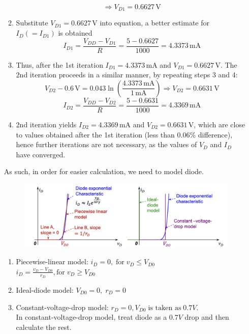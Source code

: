 \begin{enumerate}
\begin{enumerate}
        \[ \Rightarrow V_{D1} = 0.6627 \, \text{V} \]
        \item Substitute \( V_{D1} = 0.6627 \, \text{V} \) into equation, a better estimate for \( I_D ( = I_{D1} ) \) is obtained
        \[ I_{D1} = \frac{V_{DD} - V_{D1}}{R} = \frac{5 - 0.6627}{1000} = 4.3373 \, \text{mA} \]
        \item Thus, after the 1st iteration \( I_{D1} = 4.3373 \, \text{mA} \) and \( V_{D1} = 0.6627 \, \text{V} \). The 2nd iteration proceeds in a similar manner, by repeating steps 3 and 4:
        \[ V_{D2} - 0.6 \, \text{V} = 0.043 \ln(\frac{4.3373 \, \text{mA}}{1 \, \text{mA}}) \Rightarrow V_{D2} = 0.6631 \, \text{V} \]
        \[ I_{D2} = \frac{V_{DD} - V_{D2}}{R} = \frac{5 - 0.6631}{1000} = 4.3369 \, \text{mA} \]
        \item 2nd iteration yields \( I_{D2} = 4.3369 \, \text{mA} \) and \( V_{D2} = 0.6631 \, \text{V} \), which are close to values obtained after the 1st iteration (less than 0.06\% difference), hence further iterations are not necessary, as the values of \( V_D \) and \( I_D \) have converged.
    \end{enumerate}
    As such, in order for easier calculation, we need to model diode.\\
    \begin{figure}[h]
        \centering
        \includegraphics[width=1\linewidth]{image/largemodeling.png}
    \end{figure}
    \begin{enumerate}
        \item Piecewise-linear model: \(i_D = 0,\; \text{for}\; v_D\leq V_{D0}\) \\
        \(i_D = \frac{v_D - V_{D0}}{r_D}, \text{for} \; v_D \geq V_{D0}\)
        \item Ideal-diode model: \(V_{D0} = 0, \; r_D = 0\)
        \item Constant-voltage-drop model: \(r_D = 0, V_{D0} \; \text{is taken as} \; 0.7V.\) \\
        In constant-voltage-drop model, treat diode as a $0.7V$ drop and then calculate the rest.

\end{enumerate}
\end{enumerate}
